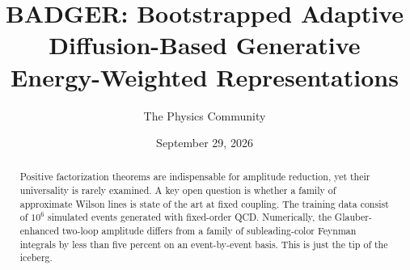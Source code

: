 \documentclass[11pt]{article}
\title{BADGER: Bootstrapped Adaptive Diffusion-Based Generative Energy-Weighted Representations}
\author{The Physics Community}
\date{September 29, 2026}
\numberwithin{equation}{section}
\theoremstyle{definition}
\theoremstyle{remark}
\begin{document}
\maketitle
\begin{abstract}
Positive factorization theorems are indispensable for amplitude
reduction, yet their universality is rarely examined. A key open
question is whether a family of approximate Wilson lines is state of the
art at fixed coupling. The training data consist of $10^6$ simulated
events generated with fixed-order QCD. Numerically, the Glauber-enhanced
two-loop amplitude differs from a family of subleading-color Feynman
integrals by less than five percent on an event-by-event basis. This is
just the tip of the iceberg.
\end{abstract}
\tableofcontents




\nocite{*}


\end{document}
